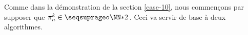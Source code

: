 \leavevmode
\smallskip

Comme dans la démonstration de la section \ref{case-10}, nous commençons par supposer que $\consprod \in \NNssquare$\,.
Ceci va servir de base à deux algorithmes.

